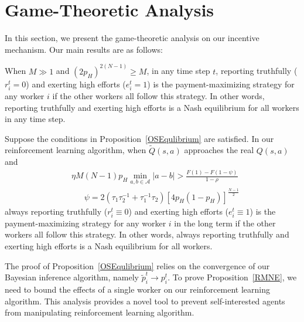 \section{Game-Theoretic Analysis}
\label{analysis}
In this section, we present the game-theoretic analysis on our incentive mechanism. Our main results are as follows:
\begin{proposition}
\label{OSEqulibrium}
When $M\gg 1$ and $(2p_H)^{2(N-1)} \geq M$, in any time step $t$, reporting truthfully ($r^{t}_i = 0$) and exerting high efforts ($e^{t}_i=1$) is the payment-maximizing strategy for any worker $i$ if the other workers all follow this strategy. In other words, reporting truthfully and exerting high efforts is a Nash equilibrium for all workers in any time step.
\end{proposition}
\begin{proposition}
\label{RMNE}
Suppose the conditions in Proposition~\ref{OSEqulibrium} are satisfied. In our reinforcement learning algorithm, when $\tilde{Q}(s,a)$ approaches the real $Q(s,a)$ and
\begin{equation}
\label{Condition}
\begin{split}
&\eta M(N-1)p_H \min_{a,b\in\mathcal{A}}|a-b|> \frac{F(1)-F(1-\psi)}{1-\rho}\\
&\quad\;\;\psi =2(\tau_1\tau_2^{-1}+\tau_1^{-1}\tau_2)[4p_H(1-p_H)]^{\frac{N-1}{2}}
\end{split}
\end{equation}
always reporting truthfully ($r^{t}_i \equiv 0$) and exerting high efforts ($e^{t}_i\equiv 1$) is the payment-maximizing strategy for any worker $i$ in the long term if the other workers all follow this strategy.
In other words, always reporting truthfully and exerting high efforts is a Nash equilibrium for all workers.
\end{proposition}
The proof of Proposition~\ref{OSEqulibrium} relies on the convergence of our Bayesian inference algorithm, namely $\tilde{p}_i^t\rightarrow p_i^t$.
To prove Proposition~\ref{RMNE}, we need to bound the effects of a single worker on our reinforcement learning algorithm.
This analysis provides a novel tool to prevent self-interested agents from manipulating reinforcement learning algorithm.


